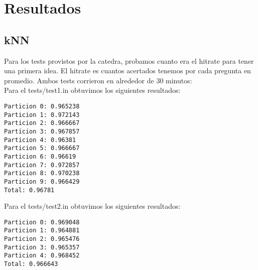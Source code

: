 \section{Resultados}

\subsection{kNN}

Para los tests provistos por la catedra, probamos cuanto era el hitrate para tener una primera idea. El hitrate es cuantos acertados tenemos por cada pregunta en promedio. Ambos tests corrieron en alrededor de 30 minutos:\\

Para el tests/test1.in obtuvimos los siguientes resultados:
\begin{verbatim}
Particion 0: 0.965238
Particion 1: 0.972143
Particion 2: 0.966667
Particion 3: 0.967857
Particion 4: 0.96381
Particion 5: 0.966667
Particion 6: 0.96619
Particion 7: 0.972857
Particion 8: 0.970238
Particion 9: 0.966429
Total: 0.96781
\end{verbatim}

Para el tests/test2.in obtuvimos los siguientes resultados:

\begin{verbatim}
Particion 0: 0.969048
Particion 1: 0.964881
Particion 2: 0.965476
Particion 3: 0.965357
Particion 4: 0.968452
Total: 0.966643
\end{verbatim}